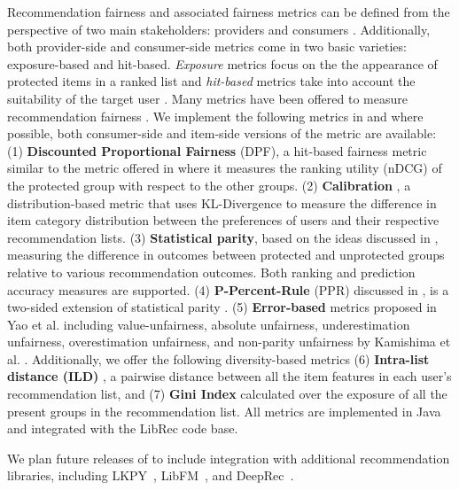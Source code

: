 Recommendation fairness and associated fairness metrics can be defined from the perspective of two main stakeholders: providers and consumers \cite{burke2017multisided}. Additionally, both provider-side and consumer-side metrics come in two basic varieties: exposure-based and hit-based. \textit{Exposure} metrics focus on the the appearance of protected items \cite{singh2018fairness} in a ranked list and \textit{hit-based} metrics take into account the suitability of the target user \cite{abdollahpouri2020multistakeholder}. Many metrics have been offered to measure recommendation fairness \cite{tsintzou2018bias,steck2018calibrated,beutel2019fairness,yao2017beyond,biega2018equity,castillo2019fairness,kuhlman2019fare,yang2017measuring}. We implement the following metrics in \libauto{} and where possible, both consumer-side and item-side versions of the metric are available: (1) \textbf{Discounted Proportional Fairness} (DPF), a hit-based fairness metric similar to the metric offered in \cite{castillo2019fairness} where it measures the ranking utility (nDCG) of the protected group with respect to the other groups. (2) \textbf{Calibration} \cite{steck2018calibrated}, a distribution-based metric that uses KL-Divergence to measure the difference in item category distribution between the preferences of users and their respective recommendation lists. (3) \textbf{Statistical parity}, based on the ideas discussed in \cite{zemel2013learning,ritov2017conditional}, measuring the difference in outcomes between protected and unprotected groups relative to various recommendation outcomes. Both ranking and prediction accuracy measures are supported. (4) \textbf{P-Percent-Rule} (PPR) discussed in \cite{biddle2006adverse}, is a two-sided extension of statistical parity \cite{barocas2016big}. (5) \textbf{Error-based} metrics proposed in Yao et al. \cite{yao2017beyond} including value-unfairness, absolute unfairness, underestimation unfairness, overestimation unfairness, and non-parity unfairness by Kamishima et al. \cite{kamishima2011fairness}. Additionally, we offer the following diversity-based metrics (6) \textbf{Intra-list distance (ILD)} \cite{ziegler2005improving}, a pairwise distance between all the item features in each user’s recommendation list, and (7) \textbf{Gini Index} calculated over the exposure of all the present groups in the recommendation list. All metrics are implemented in Java and integrated with the LibRec code base.

We plan future releases of \libauto{} to include integration with additional recommendation libraries, including LKPY~\cite{ekstrand2018lkpy}, LibFM~\cite{rendle2012factorization}, and DeepRec~\cite{zhang2019deeprec}.
